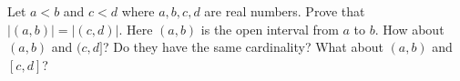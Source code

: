   Let $a < b$ and $c < d$ where $a,b,c,d$ are real
  numbers.
  Prove that $|(a, b)| = |(c, d)|$.
  Here $(a, b)$ is the open interval from $a$ to $b$.
  How about $(a, b)$ and $(c, d]$?
    Do they have the same cardinality?
    What about $(a, b)$ and $[c, d]$?
